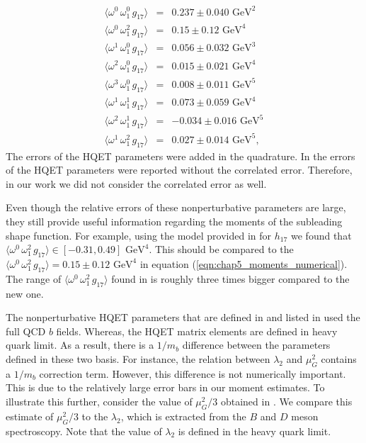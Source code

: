 \begin{eqnarray}\label{eqn:chap5_moments_numerical}
\langle\omega^0\,\omega_1^0\,g_{17}\rangle&=&0.237\pm0.040 \mbox{ GeV}^2\nonumber\\
\langle\omega^0\,\omega_1^2\,g_{17}\rangle&=&0.15\pm0.12 \mbox{ GeV}^4\nonumber\\
\langle\omega^1\,\omega_1^0\,g_{17}\rangle&=&0.056\pm0.032 \mbox{ GeV}^3\nonumber\\
\langle\omega^2\,\omega_1^0\,g_{17}\rangle&=&0.015\pm0.021 \mbox{ GeV}^4\nonumber\\
\langle\omega^3\,\omega_1^0\,g_{17}\rangle&=&0.008\pm0.011 \mbox{ GeV}^5\nonumber\\
\langle\omega^1\,\omega_1^1\,g_{17}\rangle&=&0.073\pm0.059 \mbox{ GeV}^4\nonumber\\
\langle\omega^2\,\omega_1^1\,g_{17}\rangle&=&-0.034\pm0.016 \mbox{ GeV}^5\nonumber\\
\langle\omega^1\,\omega_1^2\,g_{17}\rangle&=&0.027\pm0.014 \mbox{ GeV}^5,
\end{eqnarray}  
The errors of the HQET parameters were added in the quadrature. In \cite{Gambino:2016jkc} the errors of the HQET parameters were reported without the correlated error. Therefore, in our work we did not consider the correlated error as well. \par
Even though the relative errors of these nonperturbative parameters are large, they still provide useful information regarding the moments of the subleading shape function. For example, using the model provided in \cite{Benzke:2010js} for $h_{17}$ we found that $\langle\omega^0\,\omega_1^2\,g_{17}\rangle\in [-0.31,0.49]\text{ GeV}^4$. This should be compared to the $\langle\omega^0\,\omega_1^2\,g_{17}\rangle = 0.15\pm0.12 \mbox{ GeV}^4$ in equation (\ref{eqn:chap5_moments_numerical}). The range of $\langle\omega^0\,\omega_1^2\,g_{17}\rangle$ found in \cite{Benzke:2010js} is roughly three times bigger compared to the new one.\par
The nonperturbative HQET parameters that are defined in \cite{Mannel:2010wj} and listed in \cite{Gambino:2016jkc} used the full QCD $b$ fields. Whereas, the HQET matrix elements are defined in heavy quark limit. As a result, there is a $1/m_b$ difference between the parameters defined in these two basis. For instance, the relation between $\lambda_2$ and $\mu_G^2$ contains a $1/m_b$ correction term. However, this difference is not numerically important. This is due to the relatively large error bars in our moment estimates. To illustrate this further, consider the value of $\mu_G^2/3$ obtained in \cite{Gambino:2016jkc}. We compare this estimate of $\mu_G^2/3$ to the $\lambda_2$, which is extracted from the $B$ and $D$ meson spectroscopy. Note that the value of $\lambda_2$ is defined in the heavy quark limit.\par
